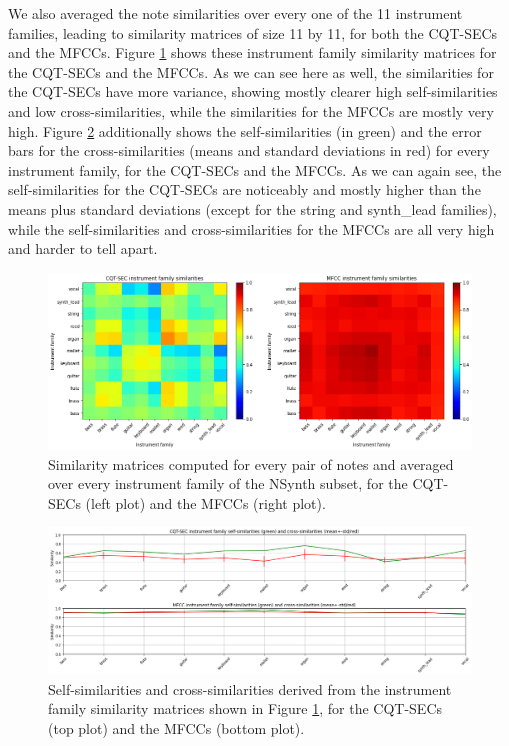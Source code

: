 \documentclass[journal]{IEEEtran}
\begin{document}
We also averaged the note similarities over every one of the 11 instrument families, leading to similarity matrices of size 11 by 11, for both the CQT-SECs and the MFCCs. Figure \ref{fig:family_similarities} shows these instrument family similarity matrices for the CQT-SECs and the MFCCs. As we can see here as well, the similarities for the CQT-SECs have more variance, showing mostly clearer high self-similarities and low cross-similarities, while the similarities for the MFCCs are mostly very high. Figure \ref{fig:family_similarities2} additionally shows the self-similarities (in green) and the error bars for the cross-similarities (means and standard deviations in red) for every instrument family, for the CQT-SECs and the MFCCs. As we can again see, the self-similarities for the CQT-SECs are noticeably and mostly higher than the means plus standard deviations (except for the string and synth\_lead families), while the self-similarities and cross-similarities for the MFCCs are all very high and harder to tell apart.

\begin{figure}[htp]
    \centering
    \includegraphics[width=\textwidth]{family_similarities.png}
    \caption{Similarity matrices computed for every pair of notes and averaged over every instrument family of the NSynth subset, for the CQT-SECs (left plot) and the MFCCs (right plot).}
    \label{fig:family_similarities}
\end{figure}

\begin{figure}[htp]
    \centering
    \includegraphics[width=\textwidth]{family_similarities2.png}
    \caption{Self-similarities and cross-similarities derived from the instrument family similarity matrices shown in Figure \ref{fig:family_similarities}, for the CQT-SECs (top plot) and the MFCCs (bottom plot).}
    \label{fig:family_similarities2}
\end{figure}
\end{document}
